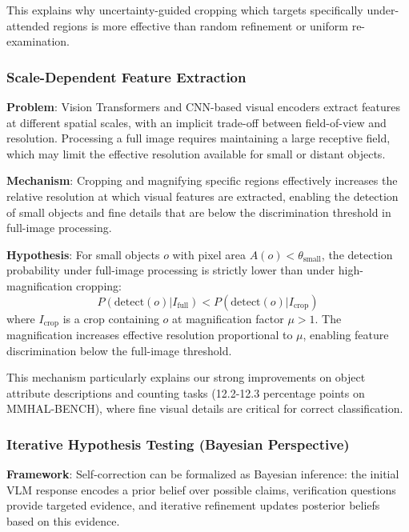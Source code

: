 \documentclass[12pt]{article}
\begin{document}
This explains why uncertainty-guided cropping which targets specifically under-attended regions is more effective than random refinement or uniform re-examination.

\subsubsection{Scale-Dependent Feature Extraction}

\textbf{Problem}: Vision Transformers and CNN-based visual encoders extract features at different spatial scales, with an implicit trade-off between field-of-view and resolution. Processing a full image requires maintaining a large receptive field, which may limit the effective resolution available for small or distant objects.

\vspace{1em}

\textbf{Mechanism}: Cropping and magnifying specific regions effectively increases the relative resolution at which visual features are extracted, enabling the detection of small objects and fine details that are below the discrimination threshold in full-image processing.

\vspace{1em}

\textbf{Hypothesis}: For small objects \(o\) with pixel area \(A(o) < \theta_{\text{small}}\), the detection probability under full-image processing is strictly lower than under high-magnification cropping:
\[P(\text{detect}(o) | I_{\text{full}}) < P(\text{detect}(o) | I_{\text{crop}})\]
where \(I_{\text{crop}}\) is a crop containing \(o\) at magnification factor \(\mu > 1\). The magnification increases effective resolution proportional to \(\mu\), enabling feature discrimination below the full-image threshold.

\vspace{1em}

This mechanism particularly explains our strong improvements on object attribute descriptions and counting tasks (12.2-12.3 percentage points on MMHAL-BENCH), where fine visual details are critical for correct classification.

\subsubsection{Iterative Hypothesis Testing (Bayesian Perspective)}

\textbf{Framework}: Self-correction can be formalized as Bayesian inference: the initial VLM response encodes a prior belief over possible claims, verification questions provide targeted evidence, and iterative refinement updates posterior beliefs based on this evidence.
\end{document}
